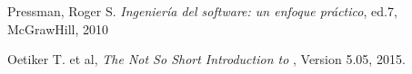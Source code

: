\begin{thebibliography}{99} %
	
	Pressman, Roger S.
	\emph{Ingeniería del software: un enfoque práctico},
	ed.7,
	McGrawHill,
	2010
	
	Oetiker T. et al,
	\emph{The Not So Short Introduction to \LaTeXe},
	Version 5.05,
	2015.
	
\end{thebibliography}